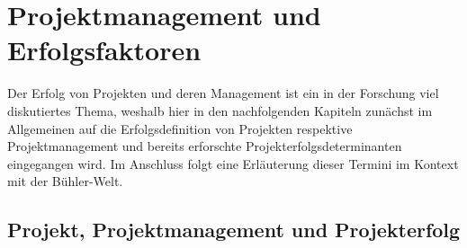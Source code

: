 \section{Projektmanagement und Erfolgsfaktoren}\label{sec:pmerf}
	
Der Erfolg von Projekten und deren Management ist ein in der Forschung viel diskutiertes Thema, weshalb hier in den nachfolgenden Kapiteln zunächst im Allgemeinen auf die Erfolgsdefinition von Projekten respektive Projektmanagement und bereits erforschte Projekterfolgsdeterminanten eingegangen wird. Im Anschluss folgt eine Erläuterung dieser Termini im Kontext mit der Bühler-Welt.
	
\subsection{Projekt, Projektmanagement und Projekterfolg}
	
